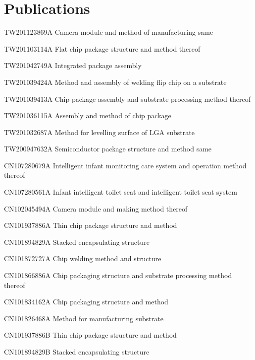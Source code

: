 \documentclass[12pt,a4paper]{report}
\begin{document}
    \section*{Publications}
    \begin{tablist}
        \item[TW201123869A] \tab{} Camera module and method of manufacturing same
        \item[TW201103114A] \tab{} Flat chip package structure and method thereof
        \item[TW201042749A] \tab{} Integrated package assembly
        \item[TW201039424A] \tab{} Method and assembly of welding flip chip on a substrate
        \item[TW201039413A] \tab{} Chip package assembly and substrate processing method thereof 
        \item[TW201036115A] \tab{} Assembly and method of chip package
        \item[TW201032687A] \tab{} Method for levelling surface of LGA substrate
        \item[TW200947632A] \tab{} Semiconductor package structure and method same
        \item[CN107280679A] \tab{} Intelligent infant monitoring care system and operation method thereof
        \item[CN107280561A] \tab{} Infant intelligent toilet seat and intelligent toilet seat system
        \item[CN102045494A] \tab{} Camera module and making method thereof
        \item[CN101937886A] \tab{} Thin chip package structure and method
        \item[CN101894829A] \tab{} Stacked encapsulating structure
        \item[CN101872727A] \tab{} Chip welding method and structure
        \item[CN101866886A] \tab{} Chip packaging structure and substrate processing method thereof
        \item[CN101834162A] \tab{} Chip packaging structure and method
        \item[CN101826468A] \tab{} Method for manufacturing substrate
        \item[CN101937886B] \tab{} Thin chip package structure and method
        \item[CN101894829B] \tab{} Stacked encapsulating structure
    \end{tablist}
\end{document}
